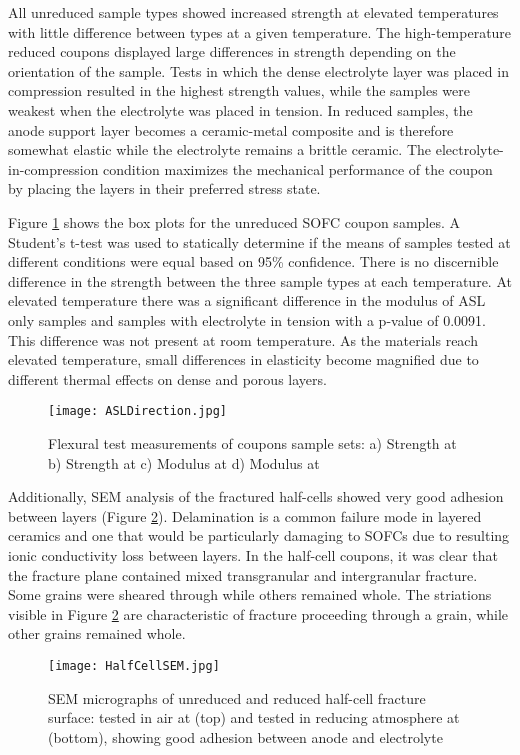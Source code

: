 All unreduced sample types showed increased strength at elevated temperatures with little difference between types at a given temperature.
The high-temperature reduced coupons displayed large differences in strength depending on the orientation of the sample.
Tests in which the dense electrolyte layer was placed in compression resulted in the highest strength values, while the samples were weakest when the electrolyte was placed in tension.
In reduced samples, the anode support layer becomes a ceramic-metal composite and is therefore somewhat elastic while the electrolyte remains a brittle ceramic.
The electrolyte-in-compression condition maximizes the mechanical performance of the coupon by placing the layers in their preferred stress state.

Figure \ref{fig:ASLDirection} shows the box plots for the unreduced SOFC coupon samples.
A Student's t-test was used to statically determine if the means of samples tested at different conditions were equal based on 95\% confidence.
There is no discernible difference in the strength between the three sample types at each temperature.
At elevated temperature there was a significant difference in the modulus of ASL only samples and samples with electrolyte in tension with a p-value of 0.0091.
This difference was not present at room temperature.
As the materials reach elevated temperature, small differences in elasticity become magnified due to different thermal effects on dense and porous layers.
\begin{figure}
    \texttt{[image: ASLDirection.jpg]}
    \caption{Flexural test measurements of coupons sample sets: a) Strength at  b) Strength at  c) Modulus at  d) Modulus at }
    \label{fig:ASLDirection}
\end{figure}

Additionally, SEM analysis of the fractured half-cells showed very good adhesion between layers (Figure \ref{fig:HalfCellSEM}).
Delamination is a common failure mode in layered ceramics and one that would be particularly damaging to SOFCs due to resulting ionic conductivity loss between layers.\cite{Sevecek2016}
In the half-cell coupons, it was clear that the fracture plane contained mixed transgranular and intergranular fracture.
Some grains were sheared through while others remained whole.
The striations visible in Figure \ref{fig:HalfCellSEM} are characteristic of fracture proceeding through a grain, while other grains remained whole.
\begin{figure}
    \texttt{[image: HalfCellSEM.jpg]}
    \caption{SEM micrographs of unreduced and reduced half-cell fracture surface: tested in air at  (top) and tested in reducing atmosphere at  (bottom), showing good adhesion between anode and electrolyte}
    \label{fig:HalfCellSEM}
\end{figure}

